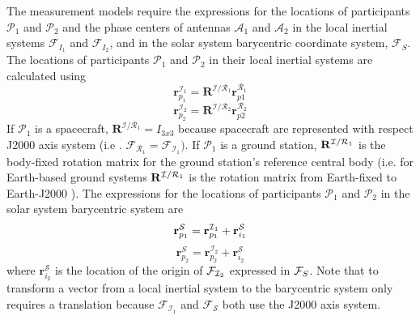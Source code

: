 The measurement models require the expressions for the locations of participants $\mathcal{P}_1$ and $\mathcal{P}_2$ and the phase centers of antennas $\mathcal{A}_1$ and $\mathcal{A}_2$ in the local inertial systems $\mathcal{F}_{I_{1}}$ and $\mathcal{F}_{I_{2}}$, and in the solar system barycentric coordinate system,  $\mathcal{F}_{S}$.  The locations of participants $\mathcal{P}_1$ and $\mathcal{P}_2$ in their local inertial systems are calculated using
%
\begin{equation}
    \mathbf{r}_{p_{1}}^{\mathcal{I}_1}  = \mathbf{R}^{\mathcal{I}/\mathcal{R}_1}\mathbf{r}_{p1}^{\mathcal{R}_1}  \label{Eq:LocalInertialParticipantPos1}
\end{equation}
%
\begin{equation}
    \mathbf{r}_{p_{2}}^{\mathcal{I}_2}  = \mathbf{R}^{\mathcal{I}/\mathcal{R}_2}\mathbf{r}_{p2}^{\mathcal{R}_2}  \label{Eq:LocalInertialParticipantPos2}
\end{equation}
%
If $\mathcal{P}_1$ is a spacecraft, $\mathbf{R}^{\mathcal{I}/\mathcal{R}_1} = I_{3x3}$ because spacecraft are represented with respect J2000 axis system (i.e .  $\mathcal{F}_{\mathcal{R}_1} = \mathcal{F}_{\mathcal{I}_1})$. If $\mathcal{P}_1$ is a ground station, $\mathbf{R}^{\mcI/\mathcal{R}_1}$ is the body-fixed rotation matrix for the ground station's reference central body (i.e. for Earth-based ground systems $\mathbf{R}^{\mcI/\mathcal{R}_1}$ is the rotation matrix from Earth-fixed to Earth-J2000 ). The expressions for the locations of participants $\mathcal{P}_1$ and $\mathcal{P}_2$ in the solar system barycentric system are
%
\begin{equation}
    \mathbf{r}_{p_{1}}^{\mcS}  =  \mathbf{r}_{p_{1}}^{\mcI_{1}} +  \mathbf{r}_{i_1}^{\mathcal{S}} \label{Eq:BarycentricParticipantPos1}
\end{equation}
%
\begin{equation}
    \mathbf{r}_{p_{2}}^{S}  = \mathbf{r}_{p_{2}}^{\mathcal{I}_{2}} + \mathbf{r}_{i_2}^{\mathcal{S}}
    \label{Eq:BarycentricParticipantPos2}
\end{equation}
%
where $\mathbf{r}_{i_2}^{\mathcal{S}}$ is the location of the origin of $\mcF_{\mcI_2}$ expressed in $\mcF_{S}$.  Note that to transform a vector from a local inertial system to the barycentric system only requires a translation because $\mathcal{F}_{\mathcal{I}_1}$ and $\mathcal{F}_{\mathcal{S}}$  both use the J2000 axis system.


